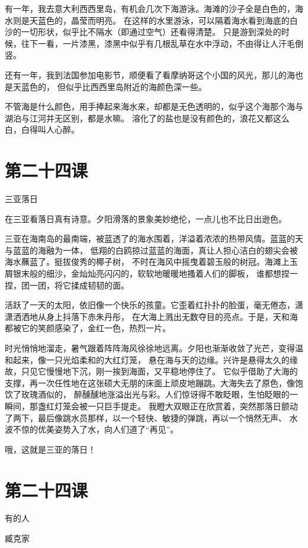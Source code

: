\documentclass[12pt,UTF8]{ctexbook}
\begin{document}
有一年，我去意大利西西里岛，有机会几次下海游泳。海滩的沙子全是白色的，海水则是天蓝色的，晶莹而明亮。
在这样的水里游泳，可以隔着海水看到海底的白沙的一切形状，似乎比不隔水（即通过空气）还看得清楚。
只是游到深处的时候，往下一看，一片漆黑，漆黑中似乎有几根乱草在水中浮动，不由得让人汗毛倒竖。

还有一年，我到法国参加电影节，顺便看了看摩纳哥这个小国的风光，那儿的海也是天蓝色的，
但似乎比西西里岛附近的海颜色深一些。

不管海是什么颜色，用手捧起来海水来，却都是无色透明的，似乎这个海那个海与湖泊与江河并无区别，都是水嘛。
溶化了的盐也是没有颜色的，浪花又都这么白，白得叫人心醉。

\section{第二十四课}

三亚落日

在三亚看落日真有诗意。夕阳滑落的景象美妙绝伦，一点儿也不比日出逊色。

三亚在海南岛的最南端，被蓝透了的海水围着，洋溢着浓浓的热带风情。蓝蓝的天与蓝蓝的海融为一体，
低翔的白鸥掠过蓝蓝的海面，真让人担心洁白的翅尖会被海水蘸蓝了。挺拔俊秀的椰子树，
不时在海风中摇曳着碧玉般的树冠。海滩上玉屑银末般的细沙，金灿灿亮闪闪的，软软地暖暖地搔着人们的脚板，
谁都想捏一捏，团一团，将它揉成韧韧的面。

活跃了一天的太阳，依旧像一个快乐的孩童。它歪着红扑扑的脸蛋，毫无倦态，潇潇洒洒地从身上抖落下赤朱丹彤，
在大海上溅出无数夺目的亮点。于是，天和海都被它的笑颜感染了，金红一色，热烈一片。

时光悄悄地溜走，暑气跟着阵阵海风徐徐地远离。夕阳也渐渐收敛了光芒，变得温和起来，像一只光焰柔和的大红灯笼，
悬在海与天的边缘。兴许是悬得太久的缘故，只见它慢慢地下沉，刚一挨到海面，又平稳地停住了。
它似乎借助了大海的支撑，再一次任性地在这张硕大无朋的床面上顽皮地蹦跳。大海失去了原色，像饱饮了玫瑰酒似的，
醉醺醺地涨溢出光与彩。人们惊讶得不敢眨眼，生怕眨眼的一瞬间，那盏红灯笼会被一只巨手提走。
我瞪大双眼正在欣赏着，突然那落日颤动了两下，最后像跳水员那样，以一个轻快、敏捷的弹跳，再以一个悄然无声、
水波不惊的优美姿势入了水，向人们道了“再见”。

哦，这就是三亚的落日！

\section{第二十四课}

有的人 

臧克家
\end{document}
